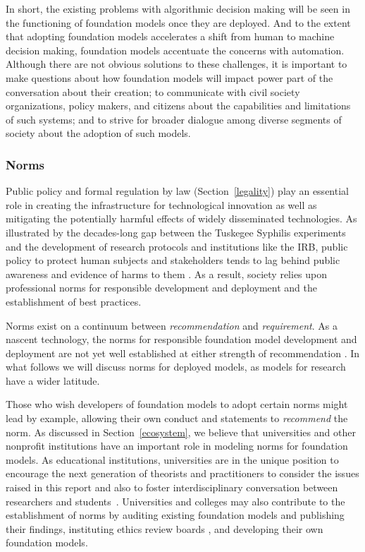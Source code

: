 In short, the existing problems with algorithmic decision making will be seen in the functioning of foundation models once they are deployed. And to the extent that adopting foundation models accelerates a shift from human to machine decision making, foundation models accentuate the concerns with automation. Although there are not obvious solutions to these challenges, it is important to make questions about how foundation models will impact power part of the conversation about their creation; to communicate with civil society organizations, policy makers, and citizens about the capabilities and limitations of such systems; and to strive for broader dialogue among diverse segments of society about the adoption of such models. 

\subsubsection{Norms} 

Public policy and formal regulation by law (Section~\ref{legality}) play an essential role in creating the infrastructure for technological innovation as well as mitigating the potentially harmful effects of widely disseminated technologies. As illustrated by the decades-long gap between the Tuskegee Syphilis experiments and the development of research protocols and institutions like the IRB, public policy to protect human subjects and stakeholders tends to lag behind public awareness and evidence of harms to them \citep{Grady2015, stark_IRBs, belmont_report}. As a result, society relies upon professional norms for responsible development and deployment and the establishment of best practices.  

Norms exist on a continuum between \textit{recommendation} and \textit{requirement}. 
As a nascent technology, the norms for responsible foundation model development and deployment are not yet well established at either strength of recommendation \citep{lawfare_norms}. In what follows we will discuss norms for deployed models, as models for research have a wider latitude.

Those who wish developers of foundation models to adopt certain norms might lead by example, allowing their own conduct and statements to \textit{recommend} the norm. As discussed in  Section~\ref{ecosystem}, we believe that universities and other nonprofit institutions have an important role in modeling norms for foundation models. As educational institutions, universities are in the unique position to encourage the next generation of theorists and practitioners to consider the issues raised in this report and also to foster interdisciplinary conversation between researchers and students~\citep{rogers2021}. Universities and colleges may also contribute to the establishment of norms by auditing existing foundation models and publishing their findings, instituting ethics review boards \citep{bernstein_esr_2021}, and developing their own foundation models. 

